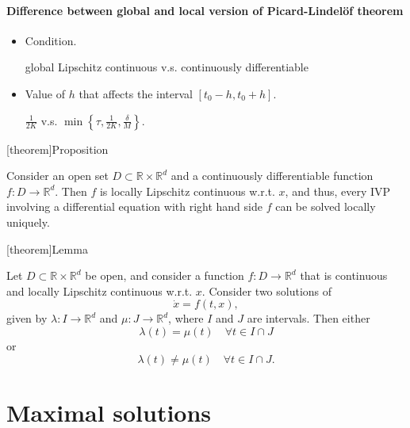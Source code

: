 \documentclass[12pt]{report}
\theoremstyle{definition}
\begin{document}
\paragraph{Difference between global and local version of Picard-Lindel\"{o}f theorem}

\begin{itemize}
        \item Condition.

            global Lipschitz continuous \quad v.s. \quad continuously differentiable
        \item Value of $h$ that affects the interval $[t_0-h,t_0+h]$.

            $\frac{1}{2K}$ \quad v.s. \quad $\min\left\{\tau, \frac{1}{2K},
            \frac{\delta}{M}\right\}$.
\end{itemize} 

[theorem]{Proposition}
\begin{continuous differentiability and Lipschitz continuity}
    Consider an open set $D\subset\mathbb{R}\times\mathbb{R}^{d}$ and a
    continuously differentiable function $f:D\rightarrow\mathbb{R}^{d}$. Then
    $f$ is locally Lipschitz continuous w.r.t. $x$, and thus,
    every IVP involving a differential equation with right hand side $f$ can be
    solved locally uniquely.
\end{continuous differentiability and Lipschitz continuity}

[theorem]{Lemma}
\begin{solutions cannot cross}
    Let $D\subset \mathbb{R}\times\mathbb{R}^{d}$ be open,
    and consider a function $f:D\rightarrow\mathbb{R}^{d}$ that is continuous
    and locally Lipschitz continuous w.r.t. $x$. Consider two solutions of
    \[
        \dot{x}=f(t,x),
    \]
    given by $\lambda:I\rightarrow\mathbb{R}^{d}$ and
    $\mu:J\rightarrow\mathbb{R}^{d}$, where $I$ and $J$ are intervals.
    Then either
    \[
        \lambda(t)=\mu(t) \quad\forall t\in I\cap J
    \]
    or
    \[
        \lambda(t)\neq\mu(t)\quad\forall t\in I\cap J.
    \]
\end{solutions cannot cross}

\section{Maximal solutions}
\end{document}
